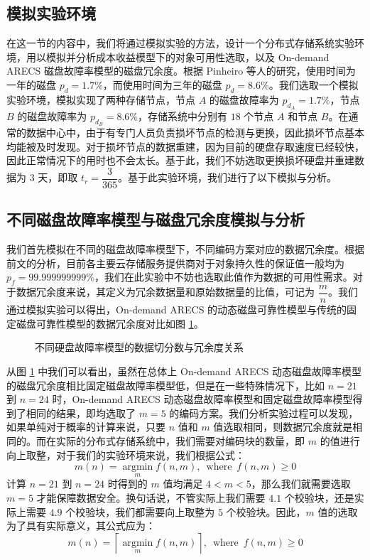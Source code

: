\subsection{模拟实验环境}
在这一节的内容中，我们将通过模拟实验的方法，设计一个分布式存储系统实验环境，用以模拟并分析成本收益模型下的对象可用性选取，以及 On-demand ARECS 磁盘故障率模型的磁盘冗余度。根据 Pinheiro 等人的研究\cite{pinheiro2007failure}，使用时间为一年的磁盘 $p_{d}=1.7\%$，而使用时间为三年的磁盘 $p_{d}=8.6\%$。我们选取一个模拟实验环境，模拟实现了两种存储节点，节点 $A$ 的磁盘故障率为 $p_{d_{A}}=1.7\%$，节点 $B$ 的磁盘故障率为 $p_{d_{B}}=8.6\%$，存储系统中分别有 $18$ 个节点 $A$ 和节点 $B$。在通常的数据中心中，由于有专门人员负责损坏节点的检测与更换，因此损坏节点基本均能被及时发现。对于损坏节点的数据重建，因为目前的硬盘存取速度已经较快，因此正常情况下的用时也不会太长。基于此，我们不妨选取更换损坏硬盘并重建数据为 $3$ 天，即取 $t_{r}=\dfrac{3}{365}$。基于此实验环境，我们进行了以下模拟与分析。
\subsection{不同磁盘故障率模型与磁盘冗余度模拟与分析}
我们首先模拟在不同的磁盘故障率模型下，不同编码方案对应的数据冗余度。根据前文的分析，目前各主要云存储服务提供商对于对象持久性的保证值一般均为 $p_{f}=99.999999999\%$，我们在此实验中不妨也选取此值作为数据的可用性需求。对于数据冗余度来说，其定义为冗余数据量和原始数据量的比值，可记为 $\dfrac{m}{n}$。我们通过模拟实验可以得出，On-demand ARECS 的动态磁盘可靠性模型与传统的固定磁盘可靠性模型的数据冗余度对比如图 \ref{p5}。

\begin{figure}[!htb]
\centering
\resizebox{.8\textwidth}{!}{}
\caption{不同硬盘故障率模型的数据切分数与冗余度关系}
\label{p5}
\end{figure}

从图 \ref{p5} 中我们可以看出，虽然在总体上 On-demand ARECS 动态磁盘故障率模型的磁盘冗余度相比固定磁盘故障率模型低，但是在一些特殊情况下，比如 $n=21$ 到 $n=24$ 时，On-demand ARECS 动态磁盘故障率模型和固定磁盘故障率模型得到了相同的结果，即均选取了 $m=5$ 的编码方案。我们分析实验过程可以发现，如果单纯对于概率的计算来说，只要 $n$ 值和 $m$ 值选取相同，则数据冗余度就是相同的。而在实际的分布式存储系统中，我们需要对编码块的数量，即 $m$ 的值进行向上取整，对于我们的实验环境来说，我们根据公式：
\begin{equation}
m(n)=\operatorname*{argmin}_{m}f(n,m),\ \operatorname*{where}\ f(n,m) \geq 0
\end{equation}
计算 $n=21$ 到 $n=24$ 时得到的 $m$ 值均满足 $4<m<5$，那么我们就需要选取 $m=5$ 才能保障数据安全。换句话说，不管实际上我们需要 $4.1$ 个校验块，还是实际上需要 $4.9$ 个校验块，我们都需要向上取整为 $5$ 个校验块。因此，$m$ 值的选取为了具有实际意义，其公式应为：
\begin{equation}
m(n)=\left\lceil\operatorname*{argmin}_{m}f(n,m)\right\rceil,\ \operatorname*{where}\ f(n,m) \geq 0
\end{equation}

